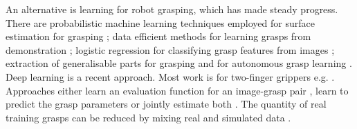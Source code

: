 An alternative is learning for robot grasping, which has made steady progress. There are probabilistic machine learning techniques employed for surface estimation for grasping \cite{dragiev2011gaussian}; data efficient methods for learning grasps from demonstration \cite{ben-amor2012a,kopicki2015ijrr,Osa2018}; logistic regression for classifying grasp features from images \cite{saxena2008a}; extraction of generalisable parts for grasping \cite{detry2012a} and for autonomous grasp learning \cite{detry2010a}. Deep learning is a recent approach. Most work is for two-finger grippers e.g. \cite{songiros20}. Approaches either learn an evaluation function for an image-grasp pair \cite{levine16,lenz2015deep,gualtieri2016high,mahler2017dex,pinto2016supersizing,johns2016deep}, learn to predict the grasp parameters \cite{redmon2015real,kumra2017iros} or jointly estimate both \cite{morrison18}. The quantity of real training grasps can be reduced by mixing real and simulated data \cite{bousmalis2017using}. 


